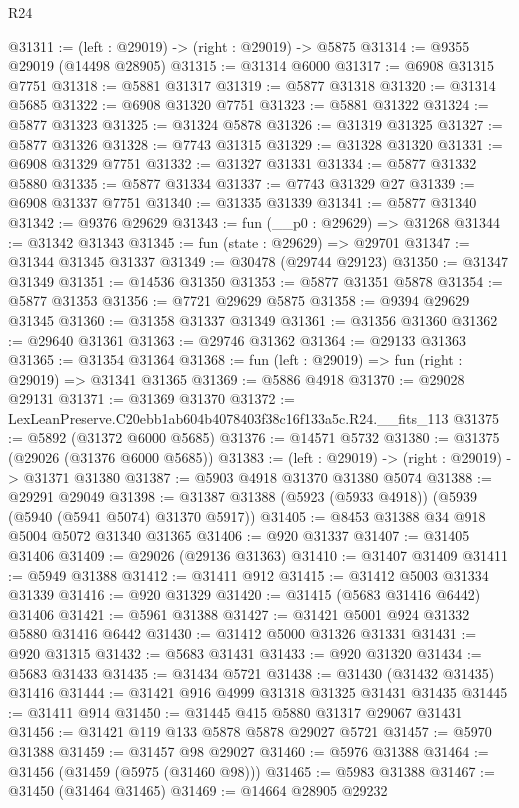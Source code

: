 \begin{lexlean}{R24}
\begin{coremodule}
@31311 := (left : @29019) -> (right : @29019) -> @5875
@31314 := @9355 @29019 (@14498 @28905)
@31315 := @31314 @6000
@31317 := @6908 @31315 @7751
@31318 := @5881 @31317
@31319 := @5877 @31318
@31320 := @31314 @5685
@31322 := @6908 @31320 @7751
@31323 := @5881 @31322
@31324 := @5877 @31323
@31325 := @31324 @5878
@31326 := @31319 @31325
@31327 := @5877 @31326
@31328 := @7743 @31315
@31329 := @31328 @31320
@31331 := @6908 @31329 @7751
@31332 := @31327 @31331
@31334 := @5877 @31332 @5880
@31335 := @5877 @31334
@31337 := @7743 @31329 @27
@31339 := @6908 @31337 @7751
@31340 := @31335 @31339
@31341 := @5877 @31340
@31342 := @9376 @29629
@31343 := fun (__p0 : @29629) => @31268
@31344 := @31342 @31343
@31345 := fun (state : @29629) => @29701
@31347 := @31344 @31345 @31337
@31349 := @30478 (@29744 @29123)
@31350 := @31347 @31349
@31351 := @14536 @31350
@31353 := @5877 @31351 @5878
@31354 := @5877 @31353
@31356 := @7721 @29629 @5875
@31358 := @9394 @29629 @31345
@31360 := @31358 @31337 @31349
@31361 := @31356 @31360
@31362 := @29640 @31361
@31363 := @29746 @31362
@31364 := @29133 @31363
@31365 := @31354 @31364
@31368 := fun (left : @29019) => fun (right : @29019) => @31341 @31365
@31369 := @5886 @4918
@31370 := @29028 @29131
@31371 := @31369 @31370
@31372 := LexLeanPreserve.C20ebb1ab604b4078403f38c16f133a5c.R24.__fits_113
@31375 := @5892 (@31372 @6000 @5685)
@31376 := @14571 @5732
@31380 := @31375 (@29026 (@31376 @6000 @5685))
@31383 := (left : @29019) -> (right : @29019) -> @31371 @31380
@31387 := @5903 @4918 @31370 @31380 @5074
@31388 := @29291 @29049
@31398 := @31387 @31388 (@5923 (@5933 @4918)) (@5939 (@5940 (@5941 @5074) @31370 @5917))
@31405 := @8453 @31388 @34 @918 @5004 @5072 @31340 @31365
@31406 := @920 @31337
@31407 := @31405 @31406
@31409 := @29026 (@29136 @31363)
@31410 := @31407 @31409
@31411 := @5949 @31388
@31412 := @31411 @912
@31415 := @31412 @5003 @31334 @31339
@31416 := @920 @31329
@31420 := @31415 (@5683 @31416 @6442) @31406
@31421 := @5961 @31388
@31427 := @31421 @5001 @924 @31332 @5880 @31416 @6442
@31430 := @31412 @5000 @31326 @31331
@31431 := @920 @31315
@31432 := @5683 @31431
@31433 := @920 @31320
@31434 := @5683 @31433
@31435 := @31434 @5721
@31438 := @31430 (@31432 @31435) @31416
@31444 := @31421 @916 @4999 @31318 @31325 @31431 @31435
@31445 := @31411 @914
@31450 := @31445 @415 @5880 @31317 @29067 @31431
@31456 := @31421 @119 @133 @5878 @5878 @29027 @5721
@31457 := @5970 @31388
@31459 := @31457 @98 @29027
@31460 := @5976 @31388
@31464 := @31456 (@31459 (@5975 (@31460 @98)))
@31465 := @5983 @31388
@31467 := @31450 (@31464 @31465)
@31469 := @14664 @28905 @29232

\end{coremodule}
\end{lexlean}
